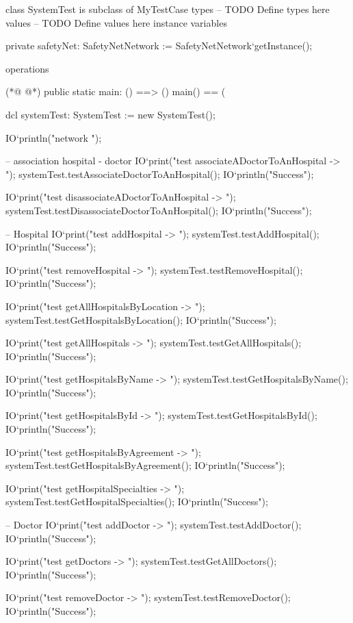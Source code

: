 \begin{vdmpp}[breaklines=true]
class SystemTest is subclass of MyTestCase
types
-- TODO Define types here
values
-- TODO Define values here
instance variables
  
  private safetyNet: SafetyNetNetwork := SafetyNetNetwork`getInstance();

operations


(*@
\label{main:13}
@*)
public static main: () ==> ()
main() == (
 
  dcl systemTest: SystemTest := new SystemTest();
 
  IO`println("network ");
 
  -- association hospital - doctor 
  IO`print("test associateADoctorToAnHospital -> ");
  systemTest.testAssociateDoctorToAnHospital();
  IO`println("Success");
  
  IO`print("test disassociateADoctorToAnHospital -> ");
  systemTest.testDisassociateDoctorToAnHospital();
  IO`println("Success");
  
  
  -- Hospital
  IO`print("test addHospital -> ");
  systemTest.testAddHospital();
  IO`println("Success");

  IO`print("test removeHospital -> ");
  systemTest.testRemoveHospital();
  IO`println("Success");
  
  IO`print("test getAllHospitalsByLocation -> ");
  systemTest.testGetHospitalsByLocation();
  IO`println("Success");
  
  IO`print("test getAllHospitals -> ");
  systemTest.testGetAllHospitals();
  IO`println("Success");
  
  IO`print("test getHospitalsByName -> ");
  systemTest.testGetHospitalsByName();
  IO`println("Success");
  
  IO`print("test getHospitalsById -> ");
  systemTest.testGetHospitalsById();
  IO`println("Success");
  
  IO`print("test getHospitalsByAgreement -> ");
  systemTest.testGetHospitalsByAgreement();
  IO`println("Success");
  
  IO`print("test getHospitalSpecialties -> ");
  systemTest.testGetHospitalSpecialties();
  IO`println("Success");

  -- Doctor
  IO`print("test addDoctor -> ");
  systemTest.testAddDoctor();
  IO`println("Success");
  
  IO`print("test getDoctors -> ");
  systemTest.testGetAllDoctors();
  IO`println("Success");
  
  IO`print("test removeDoctor -> ");
  systemTest.testRemoveDoctor();
  IO`println("Success");
  

\end{vdmpp}
